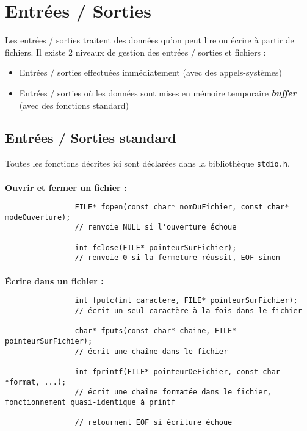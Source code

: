 \section{Entrées / Sorties}
	Les entrées / sorties traitent des données qu'on peut lire ou écrire à partir de fichiers. Il existe 2 niveaux de gestion des entrées / sorties et fichiers :
	\begin{itemize}
		\item Entrées / sorties effectuées immédiatement (avec des appels-systèmes)
		\item Entrées / sorties où les données sont mises en mémoire temporaire \textbf{\textit{buffer}} (avec des fonctions standard)
	\end{itemize}
	
	\subsection{Entrées / Sorties standard}
		Toutes les fonctions décrites ici sont déclarées dans la bibliothèque \lstinline!stdio.h!.
		
		\noindent\paragraph{}\textbf{Ouvrir et fermer un fichier :}
			
			\begin{lstlisting}
				FILE* fopen(const char* nomDuFichier, const char* modeOuverture);
				// renvoie NULL si l'ouverture échoue
				
				int fclose(FILE* pointeurSurFichier);
				// renvoie 0 si la fermeture réussit, EOF sinon
			\end{lstlisting}
		
		\noindent\paragraph{}\textbf{Écrire dans un fichier :}
		
			\begin{lstlisting}
				int fputc(int caractere, FILE* pointeurSurFichier);
				// écrit un seul caractère à la fois dans le fichier
				
				char* fputs(const char* chaine, FILE* pointeurSurFichier);
				// écrit une chaîne dans le fichier
				
				int fprintf(FILE* pointeurDeFichier, const char *format, ...); 
				// écrit une chaîne formatée dans le fichier, fonctionnement quasi-identique à printf
				
				// retournent EOF si écriture échoue
			\end{lstlisting}
			
